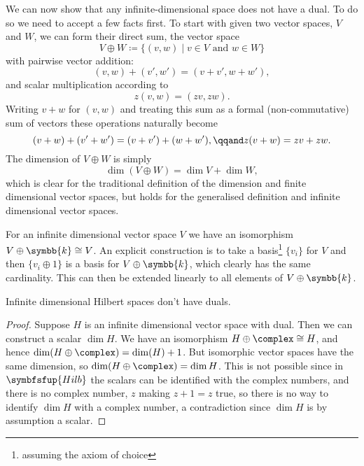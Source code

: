 \documentclass[fleqn]{NotesClass}
\makeatletter
\newcommand{\c@egory}[1]{\symbfsfup{#1}}
\renewcommand{\field}{\symbb{k}}
\newcommand{\Hilb}{\c@egory{Hilb}}
\newcommand{\isomorphic}{\cong}
\makeatother
\begin{document}
    We can now show that any infinite-dimensional space does not have a dual.
    To do so we need to accept a few facts first.
    To start with given two vector spaces, \(V\) and \(W\), we can form their direct sum, the vector space
    \begin{equation}
        V \oplus W \coloneqq \{(v, w) \mid v \in V \text{ and } w \in W\}
    \end{equation}
    with pairwise vector addition:
    \begin{equation}
        (v, w) + (v', w') = (v + v', w + w'),
    \end{equation}
    and scalar multiplication according to
    \begin{equation}
        z(v, w) = (zv, zw).
    \end{equation}
    Writing \(v + w\) for \((v, w)\) and treating this sum as a formal (non-commutative) sum of vectors these operations naturally become
    \begin{equation}
        (v + w) + (v' + w') = (v + v') + (w + w'), \qqand z(v + w) = zv + zw.
    \end{equation}
    The dimension of \(V \oplus W\) is simply
    \begin{equation}
        \dim(V \oplus W) = \dim V + \dim W,
    \end{equation}
    which is clear for the traditional definition of the dimension and finite dimensional vector spaces, but holds for the generalised definition and infinite dimensional vector spaces.
    
    For an infinite dimensional vector space \(V\) we have an isomorphism \(V \oplus \field \isomorphic V\).
    An explicit construction is to take a basis\footnote{assuming the axiom of choice} \(\{v_i\}\) for \(V\) and then \(\{v_i \oplus 1\}\) is a basis for \(V \oplus \field\), which clearly has the same cardinality.
    This can then be extended linearly to all elements of \(V \oplus \field\).
    
    \begin{lma}{}{}
        Infinite dimensional Hilbert spaces don't have duals.
        
        \begin{proof}
            Suppose \(H\) is an infinite dimensional vector space with dual.
            Then we can construct a scalar \(\dim H\).
            We have an isomorphism \(H \oplus \complex \isomorphic H\), and hence \(\dim(H \oplus \complex) = \dim(H) + 1\).
            But isomorphic vector spaces have the same dimension, so \(\dim(H \oplus \complex) = \dim H\).
            This is not possible since in \(\Hilb\) the scalars can be identified with the complex numbers, and there is no complex number, \(z\) making \(z + 1 = z\) true, so there is no way to identify \(\dim H\) with a complex number, a contradiction since \(\dim H\) is by assumption a scalar.
        \end{proof}
    \end{lma}
    
\end{document}
